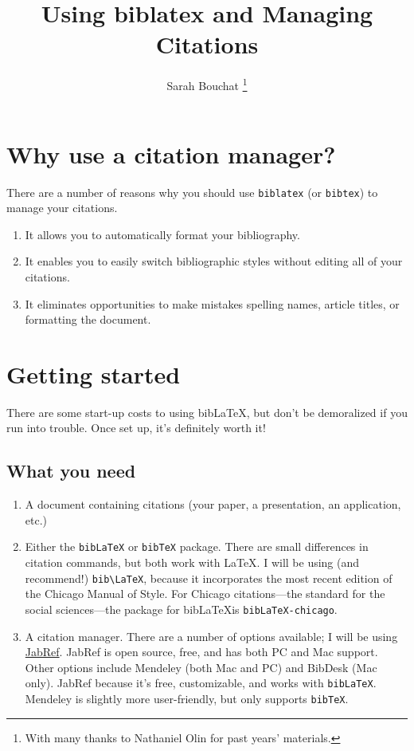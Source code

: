 \documentclass[12pt]{article}
\title{Using biblatex and Managing Citations}
\author{Sarah Bouchat \footnote{With many thanks to Nathaniel Olin for past years' materials.}}
\begin{document}
\maketitle
\pagestyle{fancy}

\section{Why use a citation manager?}

There are a number of reasons why you should use \verb+biblatex+ (or \verb+bibtex+) to manage your citations.
\begin{enumerate}
	\item It allows you to automatically format your bibliography.
	\item It enables you to easily switch bibliographic styles without editing all of your citations.
	\item It eliminates opportunities to make mistakes spelling names, article titles, or formatting the document.
\end{enumerate}

\section{Getting started}

There are some start-up costs to using bib\LaTeX, but don't be demoralized if you run into trouble. Once set up, it's definitely worth it!

\subsection{What you need}

\begin{enumerate}
\item A document containing citations (your paper, a presentation, an application, etc.)

\item Either the \verb+bibLaTeX+ or \verb+bibTeX+ package. There are small differences in citation commands, but both work with \LaTeX. I will be using (and recommend!) \verb+bib\LaTeX+, because it incorporates the most recent edition of the Chicago Manual of Style. For Chicago citations---the standard for the social sciences---the package for bib\LaTeX is \verb+bibLaTeX-chicago+.

\item A citation manager. There are a number of options available; I will be using \href{http://jabref.sourceforge.net}{JabRef}. JabRef is open source, free, and has both PC and Mac support. Other options include Mendeley (both Mac and PC) and BibDesk (Mac only). JabRef because it's free, customizable, and works with \verb+bibLaTeX+. Mendeley is slightly more user-friendly, but only supports \verb+bibTeX+.

\end{enumerate}
 
\end{document}
